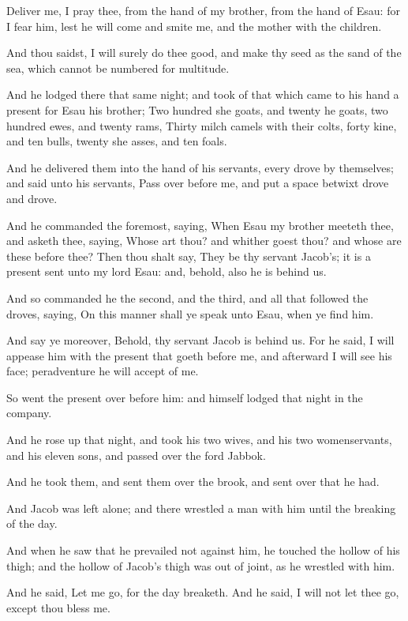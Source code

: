 \verse Deliver me, I pray thee, from the hand of my brother, from the hand of Esau: for I fear him, lest he will come and smite me, and the mother with the children.

\verse And thou saidst, I will surely do thee good, and make thy seed as the sand of the sea, which cannot be numbered for multitude.

\verse And he lodged there that same night; and took of that which came to his hand a present for Esau his brother; \verse Two hundred she goats, and twenty he goats, two hundred ewes, and twenty rams, \verse Thirty milch camels with their colts, forty kine, and ten bulls, twenty she asses, and ten foals.

\verse And he delivered them into the hand of his servants, every drove by themselves; and said unto his servants, Pass over before me, and put a space betwixt drove and drove.

\verse And he commanded the foremost, saying, When Esau my brother meeteth thee, and asketh thee, saying, Whose art thou? and whither goest thou? and whose are these before thee?  \verse Then thou shalt say, They be thy servant Jacob's; it is a present sent unto my lord Esau: and, behold, also he is behind us.

\verse And so commanded he the second, and the third, and all that followed the droves, saying, On this manner shall ye speak unto Esau, when ye find him.

\verse And say ye moreover, Behold, thy servant Jacob is behind us. For he said, I will appease him with the present that goeth before me, and afterward I will see his face; peradventure he will accept of me.

\verse So went the present over before him: and himself lodged that night in the company.

\verse And he rose up that night, and took his two wives, and his two womenservants, and his eleven sons, and passed over the ford Jabbok.

\verse And he took them, and sent them over the brook, and sent over that he had.

\verse And Jacob was left alone; and there wrestled a man with him until the breaking of the day.

\verse And when he saw that he prevailed not against him, he touched the hollow of his thigh; and the hollow of Jacob's thigh was out of joint, as he wrestled with him.

\verse And he said, Let me go, for the day breaketh. And he said, I will not let thee go, except thou bless me.

